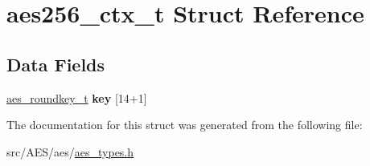 \hypertarget{structaes256__ctx__t}{\section{aes256\-\_\-ctx\-\_\-t Struct Reference}
\label{structaes256__ctx__t}
}
\subsection*{Data Fields}
\begin{DoxyCompactItemize}
\item 
\hypertarget{structaes256__ctx__t_aac9ff4933a314ba93b4bec6e92199d17}{\hyperlink{structaes__roundkey__t}{aes\-\_\-roundkey\-\_\-t} {\bfseries key} \mbox{[}14+1\mbox{]}}\label{structaes256__ctx__t_aac9ff4933a314ba93b4bec6e92199d17}

\end{DoxyCompactItemize}


The documentation for this struct was generated from the following file\-:\begin{DoxyCompactItemize}
\item 
src/\-A\-E\-S/aes/\hyperlink{aes__types_8h}{aes\-\_\-types.\-h}\end{DoxyCompactItemize}
